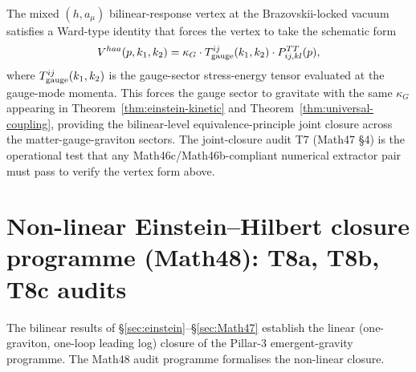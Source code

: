 \begin{theorem}
\label{thm:Math47-Ward}
The mixed $(h, a_\mu)$ bilinear-response vertex at the
Brazovskii-locked vacuum satisfies a Ward-type identity that forces
the vertex to take the schematic form
\[
V^{h a a}(p, k_1, k_2) = \kappa_G \cdot
T_{\rm gauge}^{ij}(k_1, k_2) \cdot P^{TT}_{ij, kl}(p),
\]
where $T_{\rm gauge}^{ij}(k_1, k_2)$ is the gauge-sector
stress-energy tensor evaluated at the gauge-mode momenta. This
forces the gauge sector to gravitate with the same $\kappa_G$
appearing in Theorem~\ref{thm:einstein-kinetic} and
Theorem~\ref{thm:universal-coupling}, providing the bilinear-level
equivalence-principle joint closure across the matter-gauge-graviton
sectors. The joint-closure audit T7 (Math47 \S4) is the operational
test that any Math46c/Math46b-compliant numerical extractor pair
must pass to verify the vertex form above.
\end{theorem}

\section{Non-linear Einstein--Hilbert closure programme
(Math48): T8a, T8b, T8c audits}\label{sec:Math48}

The bilinear results of \S\ref{sec:einstein}--\S\ref{sec:Math47}
establish the linear (one-graviton, one-loop leading log) closure
of the Pillar-3 emergent-gravity programme. The Math48 audit
programme formalises the non-linear closure.

